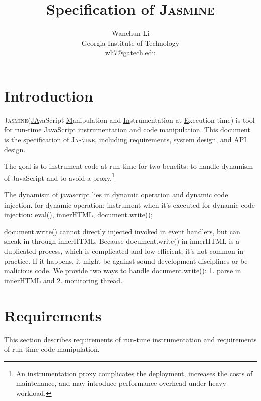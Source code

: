 \documentclass[a4paper,twocolumn,10pt]{article}
\newcommand{\jasmine}{{\textsc{Jasmine}}\xspace}
\begin{document}
\date{}

\title{\Large \bf Specification of \jasmine}
\author{
{\rm Wanchun Li}\\
Georgia Institute of Technology\\
wli7@gatech.edu
}

\maketitle
\pagestyle{plain}

\section{Introduction}
\jasmine (\underline{JA}vaScript \underline{M}anipulation and \underline{In}strumentation at \underline{E}xecution-time) is tool for run-time JavaScript instrumentation and code manipulation. This document is the specification of \jasmine, including requirements, system design, and API design.

The goal is to instrument code at run-time for two benefits: to handle dynamism of JavaScript and to avoid a proxy.\footnote{An instrumentation proxy complicates the deployment, increases the costs of maintenance, and may introduce performance overhead under heavy workload.}

The dynamism of javascript lies in dynamic operation and dynamic code injection.
for dynamic operation: instrument when it's executed
for dynamic code injection: eval(), innerHTML, document.write();

document.write() cannot directly injected invoked in event handlers, but can sneak in through innerHTML. Because document.write() in innerHTML is a duplicated process, which is complicated and low-efficient, it's not common in practice. If it happens, it might be against sound development disciplines or be malicious code. We provide two ways to handle document.write(): 1. parse in innerHTML and 2. monitoring thread.


\section{Requirements}
This section describes requirements of run-time instrumentation and requirements of run-time code manipulation.
\end{document}
